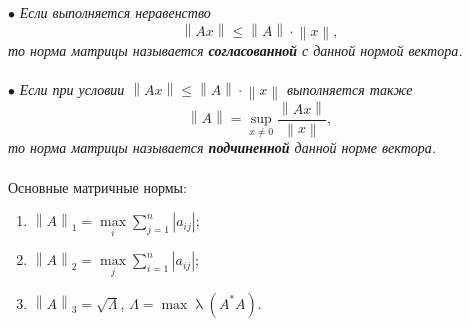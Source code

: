 \documentclass[a4paper, 12pt]{report}
\renewcommand{\leq}{\leqslant}
\renewcommand{\lambda}{\uplambda}
\newcommand\Norm[1]{\left\| #1 \right\|}
\begin{document}
	$\bullet$ \textit{Если выполняется неравенство $$\Norm{Ax} \leq \Norm{A} \cdot \Norm{x},$$ то норма матрицы называется \textbf{согласованной} с данной нормой вектора.}\\\\
	$\bullet$ \textit{Если при условии $\Norm{Ax} \leq \Norm{A} \cdot \Norm{x}$ выполняется также $$\left \|A\right \| = \underset{x \ne 0}{\sup}\dfrac{\Norm{Ax}}{\Norm{x}},$$ то норма матрицы называется \textbf{подчиненной} данной норме вектора.}\\\\
	Основные матричные нормы:\begin{enumerate}
		\item $\Norm{A}_1 = \underset{i}{\max}\sum_{j=1}^{n}|a_{ij}|$;
		\item  $\Norm{A}_2 = \underset{j}{\max}\sum_{i=1}^{n}|a_{ij}|$;
		\item  $\Norm{A}_3 = \sqrt{\Lambda}$, $\Lambda = \max \lambda(A^* A)$.
	\end{enumerate}
\end{document}
